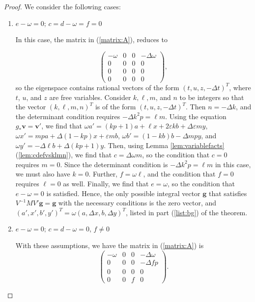 \documentclass{amsart}     %
\theoremstyle{definition}
\begin{document}
\begin{proof}
We consider the following cases:

\begin{enumerate}
\item\label{case:brightgreen} $e - \omega = 0; \, c = d - \omega  = f = 0$

In this case, the matrix in (\ref{matrix:A}), reduces to 

\[ \begin{pmatrix} -\omega  & 0 & 0 &  -\Delta \omega  \\
 0& 0 & 0 & 0\\ 
 0 & 0 & 0  & 0 \\ 
0 & 0 & 0 &  0\end{pmatrix},\]
%
so the eigenspace contains rational vectors of the form $(t, u, z, -\Delta t)^T$, where $t$, $u$, and $z$ are free variables. Consider $k,\ell,m$, and $n$ to be integers so that the vector $ (k,\ell,m,n)^T$ is of the form $(t, u, z, -\Delta t)^T$. Then $n = -\Delta k$, and the determinant condition requires $-\Delta k^2 p = \ell m $. Using the equation $g_* \textbf{v} = \textbf{v}'$,  we find that $\omega a ' = ( kp+1)a +  \ell x + 2 \varepsilon   k b + \Delta \varepsilon   m y $, $\omega x' =   mpa + \Delta  (1-  kp) x + \varepsilon   mb$, $\omega b' = (1- kb)b - \Delta  m p y$, and $\omega y' = - \Delta  \ell b + \Delta(  kp+1) y $. Then, using Lemma \ref{lem:variablefacts}(\ref{lem:cdefvsklmn}), we find that $c = \Delta\omega  m$, so the condition that $c = 0$ requires $m = 0$. Since the determinant condition is $-\Delta k^2 p = \ell m $ in this case, we must also have $k = 0$. Further, $f =  \omega \ell $, and the condition that $f = 0$ requires $\ell = 0$ as well. Finally, we find that $e = \omega$, so the condition that $e - \omega  = 0$ is satisfied. Hence, the only possible integral vector $\textbf{g}$ that satisfies $V^{-1}M V' \textbf{g} = \textbf{g}$ with the necessary conditions is the zero vector, and $(a', x', b', y')^T = \omega (a, \Delta x, b, \Delta y)^T$, listed in part (\ref{list:bg}) of the theorem. 

\item\label{case:plainblue} $e - \omega = 0; \, c = d - \omega   = 0$, $f \neq 0$ 

With these assumptions, we have the matrix in (\ref{matrix:A}) is
%
\[ \begin{pmatrix} -\omega  & 0 & 0 &  -\Delta \omega  \\
 0& 0 & 0 & -\Delta f p\\ 
0& 0 & 0  & 0 \\ 
0 & 0 & f &  0\end{pmatrix}.\]


\end{enumerate}
\end{proof}
\end{document}
